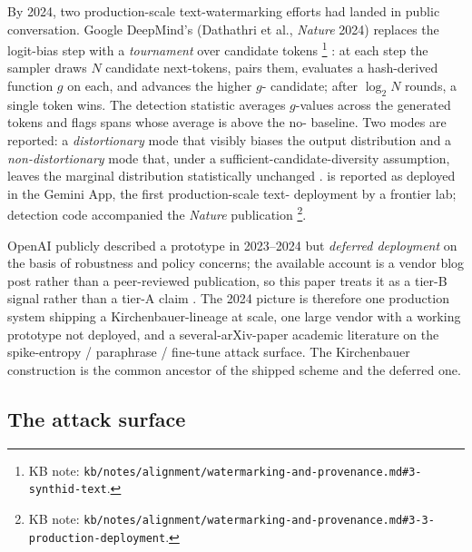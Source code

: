 By 2024, two production-scale text-watermarking efforts had landed in
public conversation. Google DeepMind's \textbf{} (Dathathri
et al., \emph{Nature} 2024) replaces the logit-bias step with a
\emph{tournament} over candidate tokens%
\footnote{KB note: \nolinkurl{kb/notes/alignment/watermarking-and-provenance.md#3-synthid-text}.}
: at each
step the sampler draws $N$ candidate next-tokens, pairs them, evaluates
a hash-derived  function $g$ on each, and advances the higher
$g$- candidate; after $\log_2 N$ rounds, a single token wins. The
detection statistic averages $g$-values across the generated tokens and
flags spans whose average is above the no- baseline. Two modes
are reported: a \emph{distortionary} mode that visibly biases the
output distribution and a \emph{non-distortionary} mode that, under
a sufficient-candidate-diversity assumption, leaves the marginal
distribution statistically unchanged .  is reported as
deployed in the Gemini App, the first production-scale text-
deployment by a frontier lab; detection code accompanied the
\emph{Nature} publication%
\footnote{KB note: \nolinkurl{kb/notes/alignment/watermarking-and-provenance.md#3-3-production-deployment}.}.

OpenAI publicly described a  prototype in 2023--2024 but
\emph{deferred deployment} on the basis of robustness and policy
concerns; the available account is a vendor blog post rather than a
peer-reviewed publication, so this paper treats it as a tier-B signal
rather than a tier-A claim
.
The 2024 picture is therefore one production system shipping a
Kirchenbauer-lineage  at scale, one large vendor with a
working prototype not deployed, and a several-arXiv-paper academic
literature on the spike-entropy / paraphrase / fine-tune attack
surface. The Kirchenbauer construction is the common ancestor of the
shipped scheme and the deferred one.

\subsection{The attack surface}
\label{sec:watermarking-attacks}

